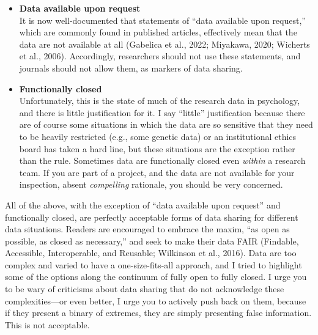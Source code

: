 \documentclass[authordate, empirical,issue]{jote-new-article}
\begin{document}
\begin{itemize}
  \item  \textbf{Data available upon request}\\
        It is now well-documented that statements of “data available upon request,” which are commonly found in published articles, effectively mean that the data are not available at all (Gabelica et al., 2022; Miyakawa, 2020; Wicherts et al., 2006). Accordingly, researchers should not use these statements, and journals should not allow them, as markers of data sharing.







  \item \textbf{Functionally closed}\\
        Unfortunately, this is the state of much of the research data in psychology, and there is little justification for it. I say “little” justification because there are of course some situations in which the data are so sensitive that they need to be heavily restricted (e.g., some genetic data) or an institutional ethics board has taken a hard line, but these situations are the exception rather than the rule. Sometimes data are functionally closed even \emph{within} a research team. If you are part of a project, and the data are not available for your inspection, absent \emph{compelling} rationale, you should be very concerned.


\end{itemize}





All of the above, with the exception of “data available upon request” and functionally closed, are perfectly acceptable forms of data sharing for different data situations. Readers are encouraged to embrace the maxim, “as open as possible, as closed as necessary,” and seek to make their data FAIR (Findable, Accessible, Interoperable, and Reusable; Wilkinson et al., 2016). Data are too complex and varied to have a one-size-fits-all approach, and I tried to highlight some of the options along the continuum of fully open to fully closed. I urge you to be wary of criticisms about data sharing that do not acknowledge these complexities—or even better, I urge you to actively push back on them, because if they present a binary of extremes, they are simply presenting false information. This is not acceptable.
\end{document}
